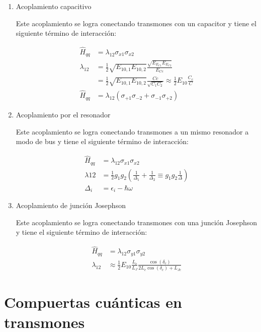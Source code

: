 \begin{enumerate}
    \item Acoplamiento capacitivo

        Este acoplamiento se logra conectando transmones con un capacitor y tiene el siguiente término de interacción:

        \begin{align*}
            \hat{H}_{qq} &= \lambda_{1 2} \sigma_{x1} \sigma_{x2} \\
            \lambda_{1 2} &= \frac{1}{2} \sqrt{E_{1 0, 1} E_{1 0, 2}} \frac{\sqrt{E_{E_{C1}} E_{E_{C2}}}}{E_{Cc}} \\
                          &= \frac{1}{2} \sqrt{E_{1 0, 1} E_{1 0, 2}} \frac{Cc}{\sqrt{C_1 C_2}} \approx \frac{1}{2} E_{1 0} \frac{C_c}{C} \\
            \hat{H}_{qq} &= \lambda_{1 2} (\sigma_{+1} \sigma_{-2}  + \sigma_{-1} \sigma_{+2})
        \end{align*}

    \item Acoplamiento por el resonador

        Este acoplamiento se logra conectando transmones a un mismo resonador a modo de bus y tiene el siguiente término de interacción:

        \begin{align*}
            \hat{H}_{qq} &= \lambda_{1 2} \sigma_{x1} \sigma_{x2} \\
            \lambda{1 2} &= \frac{1}{2} g_1 g_2 (\frac{1}{\Delta_1} + \frac{1}{\Delta_2} \equiv g_1 g_2 \frac{1}{\Delta}) \\
            \Delta_i &= \epsilon_i - \hbar \omega
        \end{align*}

    \item Acoplamiento de junción Josephson

        Este acoplamiento se logra conectando transmones con una junción Josephson y tiene el siguiente término de interacción:

        \begin{align*}
            \hat{H}_{qq} &= \lambda_{1 2} \sigma_{y1} \sigma_{y2} \\
            \lambda_{1 2} &\approx \frac{1}{2} E_{1 0} \frac{L_c}{L_J} \frac{\cos(\delta_c)}{2L_c \cos(\delta_c) + L_{J c}}
        \end{align*}
\end{enumerate}

\section{Compuertas cuánticas en transmones}

